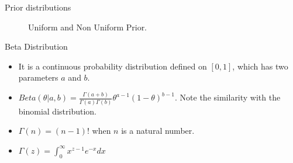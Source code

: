 \documentclass{beamer}
\begin{document}
\begin{frame}{Prior distributions}
\begin{figure}
    \centering
    \qquad
    \caption{Uniform and Non Uniform Prior.}
    \label{fig:example}
\end{figure}
\end{frame}


\begin{frame}{Beta Distribution}
\begin{itemize}
    \item It is a continuous probability distribution defined on $[0, 1]$, which has two parameters $a$ and $b$.

    \item $Beta(\theta | a, b) = \frac{\Gamma(a + b)}{\Gamma(a)\Gamma(b)}\theta^{a-1}(1 - \theta)^{b - 1}$. Note the similarity with the binomial distribution.
    \item $\Gamma(n) = (n - 1)!$ when $n$
 is a natural number.
 \item $\Gamma(z) = \int_0^\infty x^{z-1}e^{-x}dx$

 \end{itemize}
\end{frame}
\end{document}
